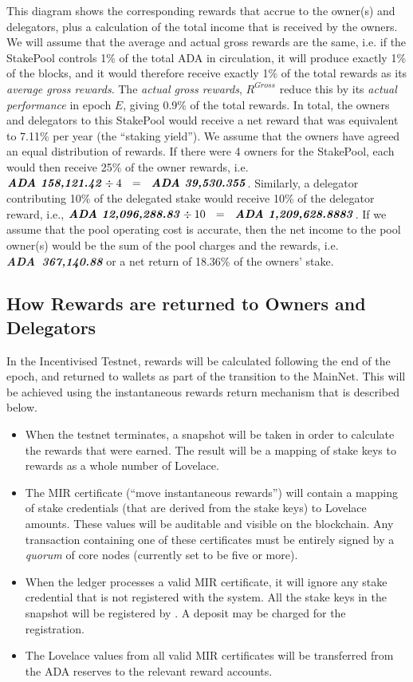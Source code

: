 \documentclass[11pt,a4paper,dvipsnames,twosided,final]{article}
\newcommand{\ada}{ADA{}}
\newcommand{\ADA}[1]{\textbf{\emph{\ada~{#1}}}}
\begin{document}
\noindent
This diagram shows the corresponding rewards that accrue to the owner(s) and delegators,
plus a calculation of the total income that is received by the owners.  We will assume that the average
and actual gross rewards are the same, i.e. if the StakePool controls 1\% of the total \ada{} in
circulation, it will produce exactly 1\% of the blocks, and it would therefore receive exactly 1\% of the total rewards
as its \emph{average gross rewards}.
The \emph{actual gross rewards}, $R^{\textit{Gross}}$ reduce this by its
\emph{actual performance} in epoch $E$, giving 0.9\% of the total rewards.
In total, the
owners and delegators to this StakePool would receive a net reward that was equivalent to 7.11\% per year
(the ``staking yield'').
We assume that the owners have agreed an equal distribution of rewards.
If there were 4 owners for the StakePool, each would then receive
25\% of the owner rewards, i.e. $\ADA{158,121.42} \div 4 ~~=~~ \ADA{39,530.355}$.
Similarly, a delegator contributing 10\% of the delegated stake would receive 10\% of
the delegator reward, i.e., $\ADA{12,096,288.83} \div 10 ~~=~~ \ADA{1,209,628.8883}$.
If we assume that the pool operating cost is accurate, then the net income to the pool owner(s) would be the sum of the
pool charges and the rewards, i.e. \ADA{367,140.88} or a net return of 18.36\% of the owners' stake.


\subsection{How Rewards are returned to Owners and Delegators}
\label{sec:rewards-return}

In the Incentivised Testnet, rewards will be calculated following the end of the epoch,
and returned to wallets as part of the transition to the MainNet.  This will be achieved
using the instantaneous rewards return mechanism that is described below.

\begin{itemize}
  \item
    When the testnet terminates, a snapshot will be taken in order to calculate the rewards that were earned.
    The result will be a mapping of stake keys to rewards as a whole number of Lovelace.
  \item
    The MIR certificate (``move instantaneous rewards'') will contain a mapping of stake credentials (that are derived from the stake keys)
    to Lovelace amounts.  These values will be auditable and visible on the blockchain.
    Any  transaction containing one of these certificates must be entirely
    signed by a \emph{quorum} of core nodes (currently set to be five or more).
  \item
    When the ledger processes a valid MIR certificate, it will ignore any stake credential that is not registered with the system.
    All the stake keys in the snapshot will be registered by \IOHK{}. A deposit may be charged for the registration.
  \item
      The Lovelace values from all valid MIR certificates will be transferred from the \ada{} reserves
      to the relevant reward accounts.
 \end{itemize}
\end{document}
